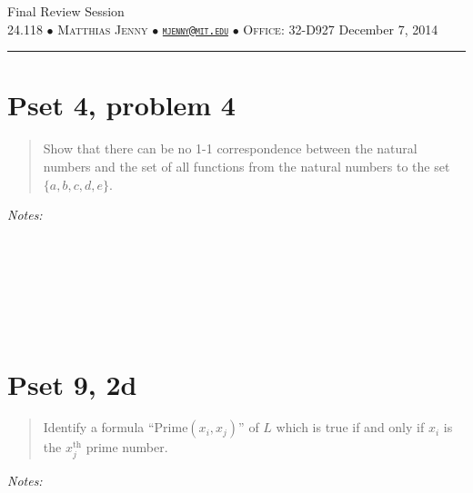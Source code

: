 \documentclass[justified]{tufte-handout}
\newcommand{\HRule}{\rule{\linewidth}{0.1mm}}
\begin{document}
\begin{fullwidth}
\noindent\LARGE Final Review Session  \normalsize \\[.3cm]
\noindent  \textsc{24.118 $\bullet$ Matthias Jenny $\bullet$  {\texttt{\href{mailto:mjenny@mit.edu}{mjenny@mit.edu}}} $\bullet$ Office:  32-D927} \hfill{December 7, 2014}
\noindent\HRule
\end{fullwidth}

\section{Pset 4, problem 4}

\begin{quote}Show that there can be no 1-1 correspondence between the natural numbers and the set of all functions from the natural numbers to the set $\{a, b, c, d, e\}$.\end{quote}

\noindent \emph{Notes:}  \underline{\hspace{15.4cm}}\\\\\underline{\hspace{16.43cm}}\\\\\underline{\hspace{16.43cm}}\\\\\underline{\hspace{16.43cm}}\\

\section{Pset 9, 2d}

\begin{quote}Identify a formula ``Prime$(x_i,x_j)$'' of $L$ which is true if and only if $x_i$ is the $x_j^\mathrm{th}$ prime number.\end{quote}

\noindent \emph{Notes:}  \underline{\hspace{15.4cm}}\\\\\underline{\hspace{16.43cm}}\\\\\underline{\hspace{16.43cm}}\\\\\underline{\hspace{16.43cm}}\\
\end{document}
